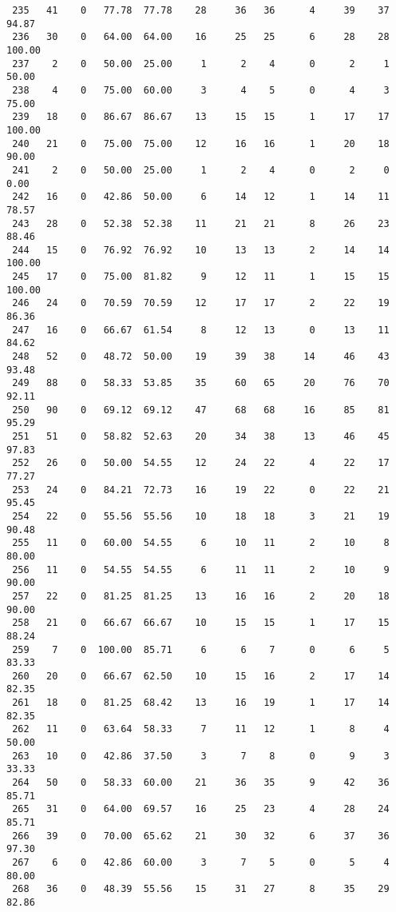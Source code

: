 \begin{verbatim}
 235   41    0   77.78  77.78    28     36   36      4     39    37    94.87
 236   30    0   64.00  64.00    16     25   25      6     28    28   100.00
 237    2    0   50.00  25.00     1      2    4      0      2     1    50.00
 238    4    0   75.00  60.00     3      4    5      0      4     3    75.00
 239   18    0   86.67  86.67    13     15   15      1     17    17   100.00
 240   21    0   75.00  75.00    12     16   16      1     20    18    90.00
 241    2    0   50.00  25.00     1      2    4      0      2     0     0.00
 242   16    0   42.86  50.00     6     14   12      1     14    11    78.57
 243   28    0   52.38  52.38    11     21   21      8     26    23    88.46
 244   15    0   76.92  76.92    10     13   13      2     14    14   100.00
 245   17    0   75.00  81.82     9     12   11      1     15    15   100.00
 246   24    0   70.59  70.59    12     17   17      2     22    19    86.36
 247   16    0   66.67  61.54     8     12   13      0     13    11    84.62
 248   52    0   48.72  50.00    19     39   38     14     46    43    93.48
 249   88    0   58.33  53.85    35     60   65     20     76    70    92.11
 250   90    0   69.12  69.12    47     68   68     16     85    81    95.29
 251   51    0   58.82  52.63    20     34   38     13     46    45    97.83
 252   26    0   50.00  54.55    12     24   22      4     22    17    77.27
 253   24    0   84.21  72.73    16     19   22      0     22    21    95.45
 254   22    0   55.56  55.56    10     18   18      3     21    19    90.48
 255   11    0   60.00  54.55     6     10   11      2     10     8    80.00
 256   11    0   54.55  54.55     6     11   11      2     10     9    90.00
 257   22    0   81.25  81.25    13     16   16      2     20    18    90.00
 258   21    0   66.67  66.67    10     15   15      1     17    15    88.24
 259    7    0  100.00  85.71     6      6    7      0      6     5    83.33
 260   20    0   66.67  62.50    10     15   16      2     17    14    82.35
 261   18    0   81.25  68.42    13     16   19      1     17    14    82.35
 262   11    0   63.64  58.33     7     11   12      1      8     4    50.00
 263   10    0   42.86  37.50     3      7    8      0      9     3    33.33
 264   50    0   58.33  60.00    21     36   35      9     42    36    85.71
 265   31    0   64.00  69.57    16     25   23      4     28    24    85.71
 266   39    0   70.00  65.62    21     30   32      6     37    36    97.30
 267    6    0   42.86  60.00     3      7    5      0      5     4    80.00
 268   36    0   48.39  55.56    15     31   27      8     35    29    82.86

\end{verbatim}
